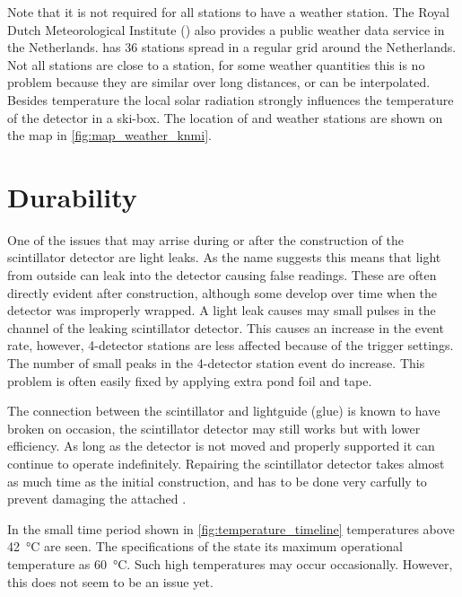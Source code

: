 Note that it is not required for all stations to have a weather station. The Royal Dutch Meteorological Institute (\knmi) also provides a public weather data service in the Netherlands. \knmi has 36 stations spread in a regular grid around the Netherlands. Not all \hisparc stations are close to a \knmi station, for some weather quantities this is no problem because they are similar over long distances, or can be interpolated. Besides temperature the local solar radiation strongly influences the temperature of the detector in a ski-box. The location of \hisparc and \knmi weather stations are shown on the map in \cref{fig:map_weather_knmi}.


\section{Durability}
\label{sec:detector-durability}

One of the issues that may arrise during or after the construction of the scintillator detector are light leaks. As the name suggests this means that light from outside can leak into the detector causing false readings. These are often directly evident after construction, although some develop over time when the detector was improperly wrapped. A light leak causes may small pulses in the channel of the leaking scintillator detector. This causes an increase in the event rate, however, 4-detector stations are less affected because of the trigger settings. The number of small peaks in the 4-detector station event do increase. This problem is often easily fixed by applying extra pond foil and tape.

The connection between the scintillator and lightguide (glue) is known to have broken on occasion, the scintillator detector may still works but with lower efficiency. As long as the detector is not moved and properly supported it can continue to operate indefinitely. Repairing the scintillator detector takes almost as much time as the initial construction, and has to be done very carfully to prevent damaging the attached \pmt.

In the small time period shown in \cref{fig:temperature_timeline} temperatures above \SI{42}{\degreeCelsius} are seen. The specifications of the \pmt state its maximum operational temperature as \SI{60}{\degreeCelsius}. Such high temperatures may occur occasionally. However, this does not seem to be an issue yet.

